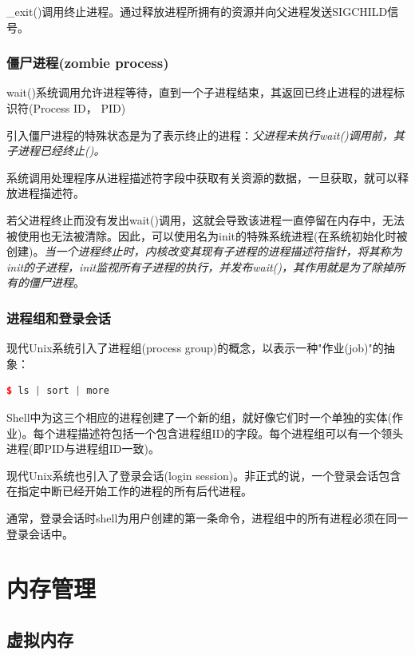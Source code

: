     \_exit()调用终止进程。通过释放进程所拥有的资源并向父进程发送SIGCHILD信号。

\subsubsection{僵尸进程(zombie process)}

    wait()系统调用允许进程等待，直到一个子进程结束，其返回已终止进程的进程标识符(Process ID， PID)

    引入僵尸进程的特殊状态是为了表示终止的进程：\emph{父进程未执行wait()调用前，其子进程已经终止()。}

    系统调用处理程序从进程描述符字段中获取有关资源的数据，一旦获取，就可以释放进程描述符。

    若父进程终止而没有发出wait()调用，这就会导致该进程一直停留在内存中，无法被使用也无法被清除。因此，可以使用名为init的特殊系统进程(在系统初始化时被创建)。\emph{当一个进程终止时，内核改变其现有子进程的进程描述符指针，将其称为init的子进程，init监视所有子进程的执行，并发布wait()，其作用就是为了除掉所有的僵尸进程}。

\subsubsection{进程组和登录会话}

    现代Unix系统引入了进程组(process group)的概念，以表示一种"作业(job)"的抽象：

\begin{lstlisting}[language=C++]
$ ls | sort | more
\end{lstlisting}

    Shell中为这三个相应的进程创建了一个新的组，就好像它们时一个单独的实体(作业)。每个进程描述符包括一个包含进程组ID的字段。每个进程组可以有一个领头进程(即PID与进程组ID一致)。

    现代Unix系统也引入了登录会话(login session)。非正式的说，一个登录会话包含在指定中断已经开始工作的进程的所有后代进程。

    通常，登录会话时shell为用户创建的第一条命令，进程组中的所有进程必须在同一登录会话中。

\section{内存管理}

\subsection{虚拟内存}


